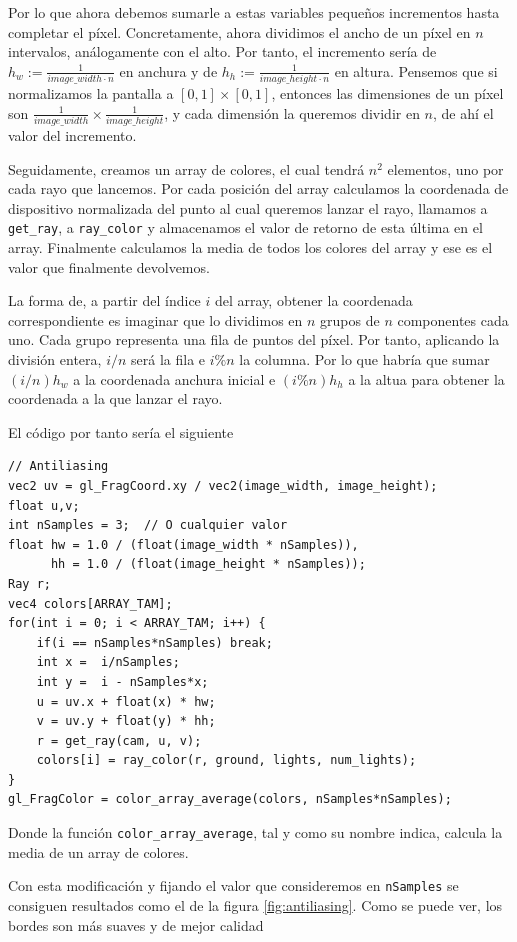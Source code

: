Por lo que ahora debemos sumarle a estas variables pequeños incrementos hasta completar el píxel. Concretamente, ahora dividimos el ancho de un píxel en $n$ intervalos, análogamente con el alto. Por tanto, el incremento sería de $h_w:=\frac{1}{image\_width\cdot n}$ en anchura y de $h_h:=\frac{1}{image\_height\cdot n}$ en altura. Pensemos que si normalizamos la pantalla a $[0,1]\times[0,1]$, entonces las dimensiones de un píxel son $\frac{1}{image\_width}\times\frac{1}{image\_height}$, y cada dimensión la queremos dividir en $n$, de ahí el valor del incremento.

Seguidamente, creamos un array de colores, el cual tendrá $n^2$ elementos, uno por cada rayo que lancemos. Por cada posición del array calculamos la coordenada de dispositivo normalizada del punto al cual queremos lanzar el rayo, llamamos a \verb|get_ray|, a \verb|ray_color| y almacenamos el valor de retorno de esta última en el array. Finalmente calculamos la media de todos los colores del array y ese es el valor que finalmente devolvemos. 

La forma de, a partir del índice $i$ del array, obtener la coordenada correspondiente es imaginar que lo dividimos en $n$ grupos de $n$ componentes cada uno. Cada grupo representa una fila de puntos del píxel. Por tanto, aplicando la división entera, $i/n$ será la fila e $i\%n$ la columna. Por lo que habría que sumar $(i/n)h_w$ a la coordenada anchura inicial e $(i\%n)h_h$ a la altua para obtener la coordenada a la que lanzar el rayo.

El código por tanto sería el siguiente

\begin{lstlisting}
// Antiliasing
vec2 uv = gl_FragCoord.xy / vec2(image_width, image_height);
float u,v;
int nSamples = 3;  // O cualquier valor
float hw = 1.0 / (float(image_width * nSamples)),
      hh = 1.0 / (float(image_height * nSamples));
Ray r;
vec4 colors[ARRAY_TAM]; 
for(int i = 0; i < ARRAY_TAM; i++) {
    if(i == nSamples*nSamples) break;
    int x =  i/nSamples;
    int y =  i - nSamples*x;
    u = uv.x + float(x) * hw;
    v = uv.y + float(y) * hh;
    r = get_ray(cam, u, v);
    colors[i] = ray_color(r, ground, lights, num_lights);
}
gl_FragColor = color_array_average(colors, nSamples*nSamples);
\end{lstlisting}
Donde la función \verb|color_array_average|, tal y como su nombre indica, calcula la media de un array de colores.

Con esta modificación y fijando el valor que consideremos en \verb|nSamples| se consiguen resultados como el de la figura \ref{fig:antiliasing}. Como se puede ver, los bordes son más suaves y de mejor calidad

